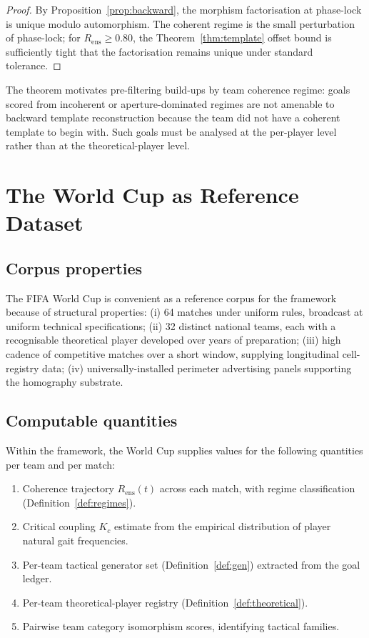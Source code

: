\documentclass[11pt,twocolumn,a4paper]{article}
\theoremstyle{definition}
\theoremstyle{remark}
\newcommand{\Rens}{R_{\mathrm{ens}}}
\newcommand{\Kc}{K_{c}}
\begin{document}
\begin{proof}
By Proposition~\ref{prop:backward}, the morphism factorisation at
phase-lock is unique modulo automorphism. The coherent regime is the
small perturbation of phase-lock; for $\Rens \geq 0.80$, the
Theorem~\ref{thm:template} offset bound is sufficiently tight that the
factorisation remains unique under standard tolerance.
\end{proof}

The theorem motivates pre-filtering build-ups by team coherence regime:
goals scored from incoherent or aperture-dominated regimes are not
amenable to backward template reconstruction because the team did not
have a coherent template to begin with. Such goals must be analysed at
the per-player level rather than at the theoretical-player level.

\section{The World Cup as Reference Dataset}
\label{sec:wc}

\subsection{Corpus properties}

The FIFA World Cup is convenient as a reference corpus for the framework
because of structural properties: (i) 64 matches under uniform rules,
broadcast at uniform technical specifications; (ii) 32 distinct national
teams, each with a recognisable theoretical player developed over
years of preparation; (iii) high cadence of competitive matches over a
short window, supplying longitudinal cell-registry data; (iv)
universally-installed perimeter advertising panels supporting the
homography substrate.

\subsection{Computable quantities}

Within the framework, the World Cup supplies values for the following
quantities per team and per match:
\begin{enumerate}[leftmargin=1.4em]
  \item Coherence trajectory $\Rens(t)$ across each match, with regime
    classification (Definition~\ref{def:regimes}).
  \item Critical coupling $\Kc$ estimate from the empirical
    distribution of player natural gait frequencies.
  \item Per-team tactical generator set (Definition~\ref{def:gen})
    extracted from the goal ledger.
  \item Per-team theoretical-player registry (Definition~\ref{def:theoretical}).
  \item Pairwise team category isomorphism scores, identifying tactical
    families.
\end{enumerate}
\end{document}
